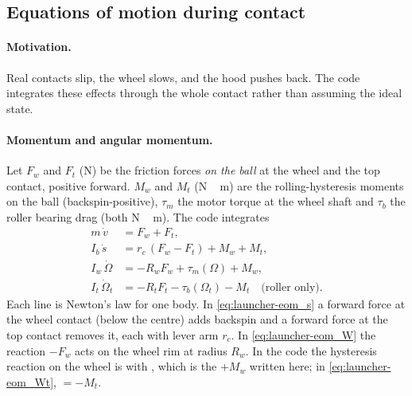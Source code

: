 \subsection{Equations of motion during contact}
\label{sec:launcher:eom}

\paragraph{Motivation.} Real contacts slip, the wheel slows, and the hood pushes back. The code integrates
these effects through the whole contact rather than assuming the ideal state.

\paragraph{Momentum and angular momentum.} Let $F_w$ and $F_t$ (\unit{N}) be the friction forces \emph{on
the ball} at the wheel and the top contact, positive forward. $M_{w}$ and $M_{t}$ (\unit{N\,m}) are the
rolling-hysteresis moments on the ball (backspin-positive), $\tau_m$ the motor torque at the wheel shaft and
$\tau_b$ the roller bearing drag (both \unit{N\,m}). The code integrates
\begin{align}
  m\,\dot v &= F_w + F_t, \label{eq:launcher-eom_v}\\
  I_b\,\dot s &= r_c\,(F_w - F_t) + M_w + M_t, \label{eq:launcher-eom_s}\\
  I_w\,\dot\Omega &= -R_w F_w + \tau_m(\Omega) + M_w, \label{eq:launcher-eom_W}\\
  I_t\,\dot\Omega_t &= -R_t F_t - \tau_b(\Omega_t) - M_t \quad\text{(roller only)}. \label{eq:launcher-eom_Wt}
\end{align}
Each line is Newton's law for one body. In \eqref{eq:launcher-eom_s} a forward force at the wheel contact
(below the centre) adds backspin and a forward force at the top contact removes it, each with lever arm
$r_c$. In \eqref{eq:launcher-eom_W} the reaction $-F_w$ acts on the wheel rim at radius $R_w$. In the code the
hysteresis reaction on the wheel is  with , which is the
$+M_w$ written here; in \eqref{eq:launcher-eom_Wt},  $= -M_t$.

